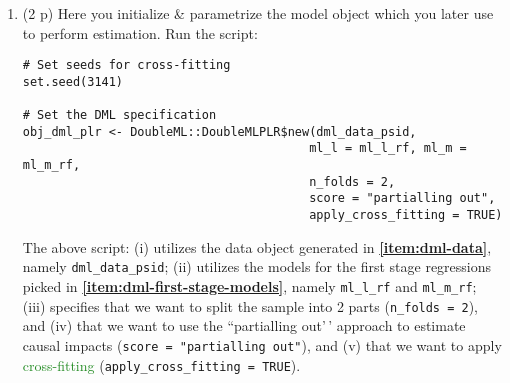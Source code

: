 \documentclass[
]{article}
\newenvironment{Shaded}{\begin{snugshade}}{\end{snugshade}}
\newcommand{\AttributeTok}[1]{\textcolor[rgb]{0.13,0.29,0.53}{#1}}
\newcommand{\ConstantTok}[1]{\textcolor[rgb]{0.56,0.35,0.01}{#1}}
\newcommand{\DecValTok}[1]{\textcolor[rgb]{0.00,0.00,0.81}{#1}}
\newcommand{\FunctionTok}[1]{\textcolor[rgb]{0.13,0.29,0.53}{\textbf{#1}}}
\newcommand{\NormalTok}[1]{#1}
\newcommand{\OtherTok}[1]{\textcolor[rgb]{0.56,0.35,0.01}{#1}}
\newcommand{\SpecialCharTok}[1]{\textcolor[rgb]{0.81,0.36,0.00}{\textbf{#1}}}
\newcommand{\StringTok}[1]{\textcolor[rgb]{0.31,0.60,0.02}{#1}}
\begin{document}
\begin{enumerate}
  \begin{enumerate}
  \def\labelenumii{\alph{enumii}.}
  \setcounter{enumii}{6}
  \item
    (2 p) Here you initialize \& parametrize the model object which you
    later use to perform estimation. Run the script:

\begin{verbatim}
# Set seeds for cross-fitting
set.seed(3141)

# Set the DML specification
obj_dml_plr <- DoubleML::DoubleMLPLR$new(dml_data_psid, 
                                        ml_l = ml_l_rf, ml_m = ml_m_rf, 
                                        n_folds = 2,
                                        score = "partialling out",
                                        apply_cross_fitting = TRUE)
\end{verbatim}

    The above script: (i) utilizes the data object generated in
    \textbf{\ref{item:dml-data}}, namely \texttt{dml\_data\_psid}; (ii)
    utilizes the models for the first stage regressions picked in
    \textbf{\ref{item:dml-first-stage-models}}, namely
    \texttt{ml\_l\_rf} and \texttt{ml\_m\_rf}; (iii) specifies that we
    want to split the sample into 2 parts (\texttt{n\_folds = 2}), and
    (iv) that we want to use the ``partialling out'\,' approach to
    estimate causal impacts (\texttt{score = "partialling out"}), and
    (v) that we want to apply \textcolor{ForestGreen}{cross-fitting}
    (\texttt{apply\_cross\_fitting = TRUE}).\label{item:dml-model}
  \end{enumerate}

\begin{Shaded}
\end{Shaded}


\end{enumerate}
\end{document}
